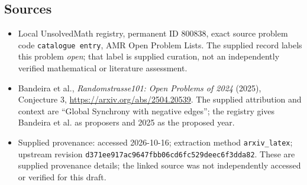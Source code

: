 \documentclass[11pt]{article}
\begin{document}
\subsection{Sources}
\begin{itemize}
\item Local UnsolvedMath registry, permanent ID \(800838\), exact source problem code \texttt{catalogue entry}, AMR Open Problem Lists. The supplied record labels this problem \emph{open}; that label is supplied curation, not an independently verified mathematical or literature assessment.
\item Bandeira et al., \emph{Randomstrasse101: Open Problems of 2024} (2025), Conjecture 3, \url{https://arxiv.org/abs/2504.20539}. The supplied attribution and context are ``Global Synchrony with negative edges''; the registry gives Bandeira et al. as proposers and 2025 as the proposed year.
\item Supplied provenance: accessed 2026-10-16; extraction method \texttt{arxiv\_latex}; upstream revision \texttt{d371ee917ac9647fbb06cd6fc529deec6f3dda82}. These are supplied provenance details; the linked source was not independently accessed or verified for this draft.
\end{itemize}
\end{document}
